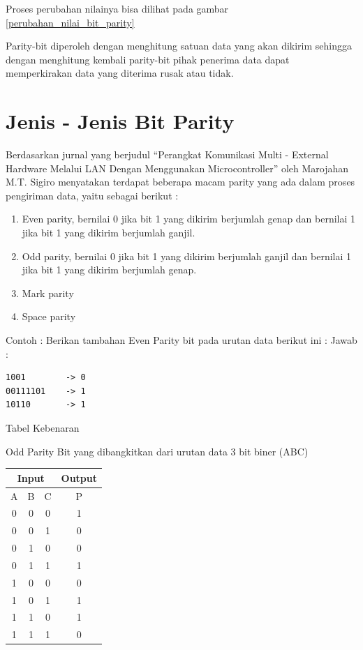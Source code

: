 Proses perubahan nilainya bisa dilihat pada gambar \ref{perubahan_nilai_bit_parity}

Parity-bit diperoleh dengan menghitung satuan data yang akan dikirim sehingga dengan menghitung kembali parity-bit pihak penerima data dapat memperkirakan data yang diterima rusak atau tidak.

\section{Jenis - Jenis Bit Parity}
Berdasarkan jurnal yang berjudul “Perangkat Komunikasi Multi - External Hardware Melalui LAN Dengan Menggunakan Microcontroller” oleh Marojahan M.T. Sigiro \cite{sigiro2013perangkat} menyatakan terdapat beberapa macam parity yang ada dalam proses pengiriman data, yaitu sebagai berikut : 
\begin{enumerate}
\item Even parity, bernilai 0 jika bit 1 yang dikirim berjumlah genap dan bernilai 1 jika bit 1 yang dikirim berjumlah ganjil. 
\item Odd parity, bernilai 0 jika bit 1 yang dikirim berjumlah ganjil dan bernilai 1 jika bit 1 yang dikirim berjumlah genap. 
\item Mark parity 
\item Space parity
\end{enumerate}

Contoh :
\newline Berikan tambahan Even Parity bit pada urutan data berikut ini :
\newline Jawab :
\begin{verbatim}
1001		-> 0
00111101	-> 1
10110		-> 1
\end{verbatim}

Tabel Kebenaran

Odd Parity Bit yang dibangkitkan dari urutan data 3 bit biner (ABC)
\begin{table}[h!]
\begin{tabular}{|c|c|c|c|}
\hline
\multicolumn{3}{|c|}{Input} & Output\\
\hline
A & B & C & P\\
\hline
0 & 0 & 0 & 1\\
\hline
0 & 0 & 1 & 0\\
\hline
0 & 1 & 0 & 0\\
\hline
0 & 1 & 1 & 1\\
\hline
1 & 0 & 0 & 0\\
\hline
1 & 0 & 1 & 1\\
\hline
1 & 1 & 0 & 1\\
\hline
1 & 1 & 1 & 0\\
\hline
\end{tabular}
\end{table}

